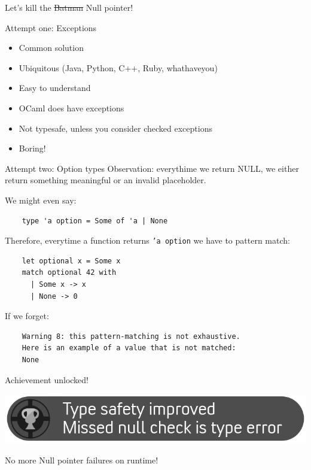 \documentclass{beamer}
\begin{document}
\begin{frame}
  \begin{center}
    {\Huge Let's kill the \sout{Batman} Null pointer!}
  \end{center}
\end{frame}

\begin{frame}{Attempt one: Exceptions}
  \begin{itemize}
    \item Common solution
    \item Ubiquitous (Java, Python, C++, Ruby, whathaveyou)
    \item Easy to understand
    \item OCaml does have exceptions
    \pause
    \item \alert{Not typesafe}, unless you consider checked exceptions
    \item Boring!
  \end{itemize}
\end{frame}

\begin{frame}[fragile]{Attempt two: Option types}
  Observation: everythime we return NULL, we either return something
  meaningful or an invalid placeholder.

  We might even say:
  \begin{verbatim}
    type 'a option = Some of 'a | None
  \end{verbatim}

  \pause

  Therefore, everytime a function returns \texttt{'a option} we have
  to pattern match:
  \begin{verbatim}
    let optional x = Some x
    match optional 42 with
      | Some x -> x
      | None -> 0
  \end{verbatim}

  \pause

  If we forget:
  \begin{verbatim}
    Warning 8: this pattern-matching is not exhaustive.
    Here is an example of a value that is not matched:
    None
  \end{verbatim}
\end{frame}

\begin{frame}{Achievement unlocked!}
  \begin{center}
    \includegraphics[width=\textwidth]{achivement-null-pointer}
  \end{center}
  \checkmark No more Null pointer failures on runtime!
\end{frame}
\end{document}
